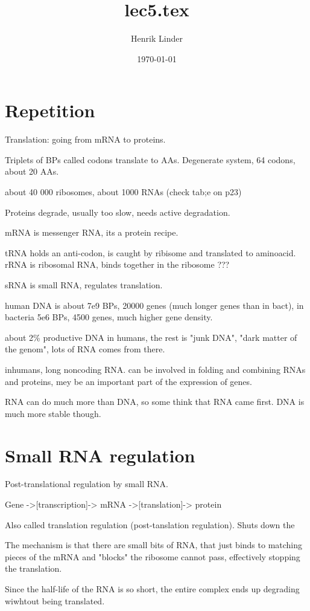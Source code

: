 \documentclass{article}
\title{lec5.tex }
\author{Henrik Linder}
\date{\today}
\begin{document}
\maketitle


\section{Repetition}
Translation: going from mRNA to proteins. 

Triplets of BPs called codons translate to AAs. Degenerate system, 64 codons, about 20 AAs. 

about 40 000 ribosomes, about 1000 RNAs (check  tab;e on p23)

Proteins degrade, usually too slow, needs active degradation. 

mRNA is messenger RNA, its a protein recipe. 

tRNA holds an anti-codon, is caught by ribisome and translated to aminoacid.
rRNA is ribosomal RNA, binds together in the ribosome ???

sRNA is small RNA, regulates translation. 

human DNA is about 7e9 BPs, 20000 genes (much longer genes than in bact), in bacteria 5e6 BPs, 4500 genes, much higher gene density. 

about 2\% productive DNA in humans, the rest is "junk DNA", "dark matter of the genom", lots of RNA comes from there. 

inhumans, long noncoding RNA. can be involved in folding and combining RNAs and proteins, mey be an important part of the expression of genes. 

RNA can do much more than DNA, so some think that RNA came first. DNA is much more stable though. 

\section{Small RNA regulation}
Post-translational regulation by small RNA. 

Gene ->[transcription]-> mRNA ->[translation]-> protein

Also called translation regulation (post-tanslation regulation). Shuts down the 

The mechanism is that there are small bits of RNA, that just binds to matching pieces of the mRNA and "blocks" the ribosome cannot pass, effectively stopping the translation. 

Since the half-life of the RNA is so short, the entire complex ends up degrading wiwhtout being translated. 
\end{document}
